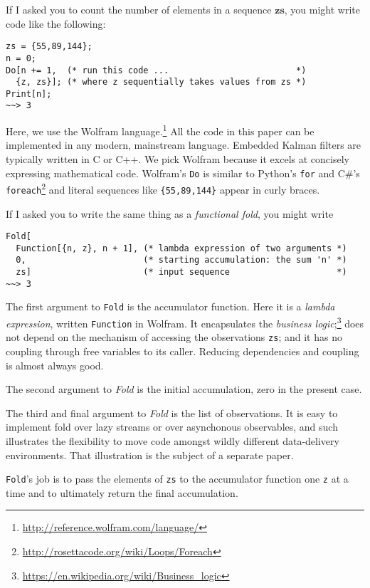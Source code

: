 \documentclass[10pt,oneside,x11names]{article}
\begin{document}
If I asked you to count the number of elements in a sequence
\(\mathbold{zs}\), you might write code like the following:

\begin{verbatim}
zs = {55,89,144};
n = 0;
Do[n += 1,  (* run this code ...                         *)
  {z, zs}]; (* where z sequentially takes values from zs *)
Print[n];
~~> 3
\end{verbatim}

\noindent Here, we use the Wolfram language.\footnote{\url{http://reference.wolfram.com/language/}} All the code in this paper
can be implemented in any modern, mainstream language. Embedded
Kalman filters are typically written in C or C++. We pick
Wolfram because it excels at concisely expressing mathematical code. Wolfram's
\texttt{Do} is similar to Python's \texttt{for} and C\#'s \texttt{foreach}\footnote{\url{http://rosettacode.org/wiki/Loops/Foreach}} and literal
sequences like \texttt{\{55,89,144\}} appear in curly braces.

If I asked you to write the same thing as a \emph{functional fold},\footnotemark[2]{} you
might write

\begin{verbatim}
Fold[
  Function[{n, z}, n + 1], (* lambda expression of two arguments *)
  0,                       (* starting accumulation: the sum 'n' *)
  zs]                      (* input sequence                     *)
~~> 3
\end{verbatim}

The first argument to \texttt{Fold} is the accumulator function.  Here it is
a \emph{lambda expression}, written \texttt{Function} in Wolfram. It
encapsulates the \emph{business logic};\footnote{\url{https://en.wikipedia.org/wiki/Business_logic}} does not depend on the mechanism of
accessing the observations \texttt{zs}; and it has no coupling through free
variables to its caller. Reducing dependencies and coupling is almost always
good.

The second argument to \emph{Fold} is the initial accumulation, zero in the present
case.

The third and final argument to \emph{Fold} is the list of observations.
It is easy to implement fold over lazy streams or over asynchonous observables, and
such illustrates the flexibility to move code amongst wildly different
data-delivery environments. That illustration is the subject of a separate paper.

\texttt{Fold}'s job is to pass the elements of \texttt{zs} to the
accumulator function one \texttt{z} at a time and to ultimately
return the final accumulation.
\end{document}

